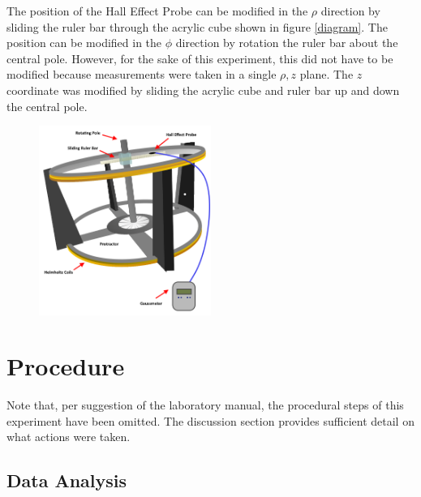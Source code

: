 \documentclass[a4paper]{article}
\begin{document}
The position of the Hall Effect Probe can be modified in the $\rho$ direction by sliding the ruler bar through the acrylic cube shown in figure \ref{diagram}. The position can be modified in the $\phi$ direction by rotation the ruler bar about the central pole. However, for the sake of this experiment, this did not have to be modified because measurements were taken in a single $\rho , z$ plane. The $z$ coordinate was modified by sliding the acrylic cube and ruler bar up and down the central pole.

\begin{figure}[h]
\centering
\includegraphics[width=0.5\textwidth]{helmholtz_diagram.png}
\label{helmholtz_diagram}
\end{figure}


\section{Procedure}




Note that, per suggestion of the laboratory manual, the procedural steps of this experiment have been omitted. The discussion section provides sufficient detail on what actions were taken.

\subsection{Data Analysis}
\end{document}

